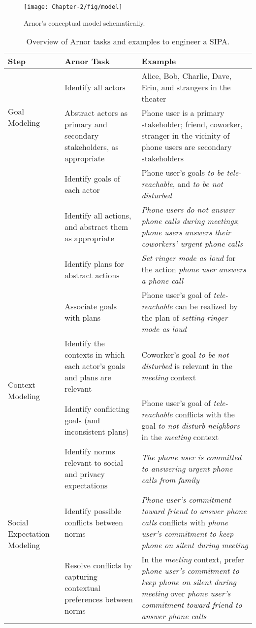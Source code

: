 \documentclass[11pt,          %
               phd,           %
               onehalfspacing %
               ]{ncsuthesis}
\newcommand{\fbf}{\textbf}
\newcommand{\fsl}{\textsl}
\newcommand{\frameworkA}{Arnor\xspace}
\begin{document}
\begin{figure}[!htb] 
\centering
\texttt{[image: Chapter-2/fig/model]}
\caption{\frameworkA 's conceptual model schematically.}
\label{fig:arnor-model} 
\end{figure}


\begin{longtable}{@{}p{2.7cm}p{6cm}p{6cm}@{}}
\caption[Overview of \frameworkA tasks.]{Overview of \frameworkA tasks and examples to engineer a SIPA.}\label{tab:arnor-steps}\\
\toprule
\fbf{Step} & \fbf{\frameworkA Task} & \fbf{Example} \\\midrule
\multirow{2}{2.7cm}{Goal Modeling}& Identify all actors &   
Alice, Bob, Charlie, Dave, Erin, and strangers in the theater\\
& Abstract actors as primary and secondary stakeholders, as appropriate & Phone
    user is a primary stakeholder; friend, coworker, 
   stranger in the vicinity of phone users are secondary 
stakeholders\\
& Identify goals of each actor & Phone user's goals
  \fsl{to be tele-reachable}, and \fsl{to be not disturbed} \\
& Identify all actions, and abstract them as appropriate &  \fsl{Phone users do 
not answer phone calls during meetings}; \fsl{phone users answers 
their coworkers' urgent phone calls}\\
& Identify plans for abstract actions & \fsl{Set ringer mode as loud} 
for 
    the action \fsl{phone user answers a phone call} \\
& Associate goals with plans & Phone user's goal of \fsl{tele-reachable} 
can
     be realized by the plan of \fsl{setting ringer mode as loud}\\
\midrule

\multirow{2}{2.7cm}{Context Modeling} & Identify the contexts in which 
each actor's goals and plans are relevant 
	& Coworker's goal \fsl{to be not disturbed} is relevant in the \fsl{meeting} context\\
& Identify conflicting goals (and inconsistent plans) & 
Phone user's goal of \fsl{tele-reachable} conflicts with the goal \fsl{to not disturb neighbors} in the \fsl{meeting} context
\\
\midrule

\multirow{3}{2.7cm}{Social Expectation Modeling} & Identify norms relevant 
to social and privacy expectations & \fsl{The phone user is committed to
    answering urgent phone calls from family}
    \\
 & Identify possible conflicts between norms & \fsl{Phone user's commitment toward friend to answer phone calls} conflicts with
 \fsl{phone user's commitment to keep phone on silent during meeting}\\
 & Resolve conflicts by capturing contextual preferences between norms & 
   In the \fsl{meeting} context, prefer \fsl{phone user's commitment to keep phone on silent during meeting} over \fsl{phone user's commitment toward friend to answer phone calls}
   \\


\end{longtable}
\end{document}
